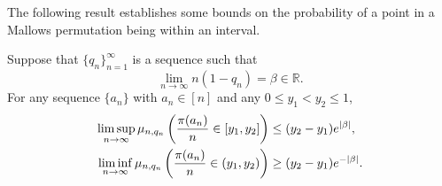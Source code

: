 
The following result establishes some bounds on the probability of a point in a Mallows permutation being within an interval.

\begin{lemma}\label{L3}
Suppose that $\{q_n\}_{n=1}^{\infty}$ is a sequence such that
\[
\lim_{n\to\infty} n (1-q_n) = \beta \in \mathbb{R}.
\]
For any sequence $\{a_n\}$ with $a_n \in [n]$ and any $0 \le y_1 < y_2 \le 1$,
\begin{align}
\limsup_{n \to \infty} \mu_{n, q_n} \left( \frac{\pi(a_n)}{n} \in [y_1, y_2] \right) &\le (y_2 - y_1) e^{|\beta|}, \label{eq:L3a}\\
\liminf_{n \to \infty} \mu_{n, q_n} \left( \frac{\pi(a_n)}{n} \in (y_1, y_2) \right) &\ge (y_2 - y_1) e^{-|\beta|}. \label{eq:L3b}
\end{align}
\end{lemma}

